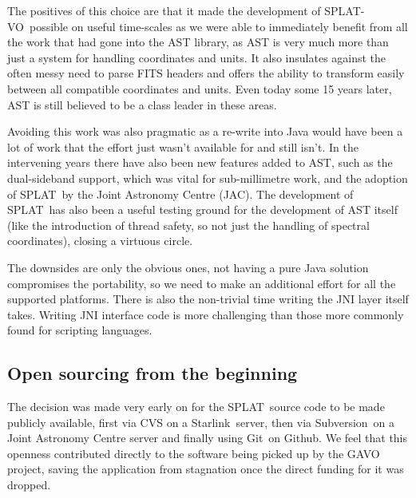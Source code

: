 \documentclass[final,authoryear,5p,times,twocolumn]{elsarticle}
\newcommand{\splat}{\textsf{\small SPLAT}}
\newcommand{\splatvo}{{\textsf{\small{SPLAT-VO}}}}
\newcommand{\Starlink}{\textsf{\small Starlink}}
\newcommand{\subversion}{\textsf{\small Subversion}}
\newcommand{\git}{\textsf{\small Git}}
\begin{document}
The positives of this choice are that it made the development of \splatvo\
possible on useful time-scales as we were able to immediately benefit from all
the work that had gone into the AST library, as AST is very much more than just
a system for handling coordinates and units. It also insulates against the
often messy need to parse FITS headers and offers the ability to transform
easily between all compatible coordinates and units. Even today some 15 years
later, AST is still believed to be a class leader in these areas.

Avoiding this work was also pragmatic as a re-write into Java would have been a
lot of work that the effort just wasn't available for and still isn't. In the
intervening years there have also been new features added to AST, such as the
dual-sideband support, which was vital for sub-millimetre work, and the
adoption of \splat\ by the Joint Astronomy Centre (JAC). The development of
\splat\ has also been a useful testing ground for the development of AST itself
(like the introduction of thread safety, so not just the handling of spectral
coordinates), closing a virtuous circle.

The downsides are only the obvious ones, not having a pure Java solution
compromises the portability, so we need to make an additional effort for all
the supported platforms. There is also the non-trivial time writing the JNI
layer itself takes. Writing JNI interface code is more challenging than those
more commonly found for scripting languages.

\subsection{Open sourcing from the beginning}
%
The decision was made very early on for the \splat\ source code to be made
publicly available, first via CVS on a \Starlink\ server, then via \subversion\
on a Joint Astronomy Centre server and finally using \git\ on Github. We feel
that this openness contributed directly to the software being picked up by the
GAVO project, saving the application from stagnation once the direct funding
for it was dropped.
\end{document}
